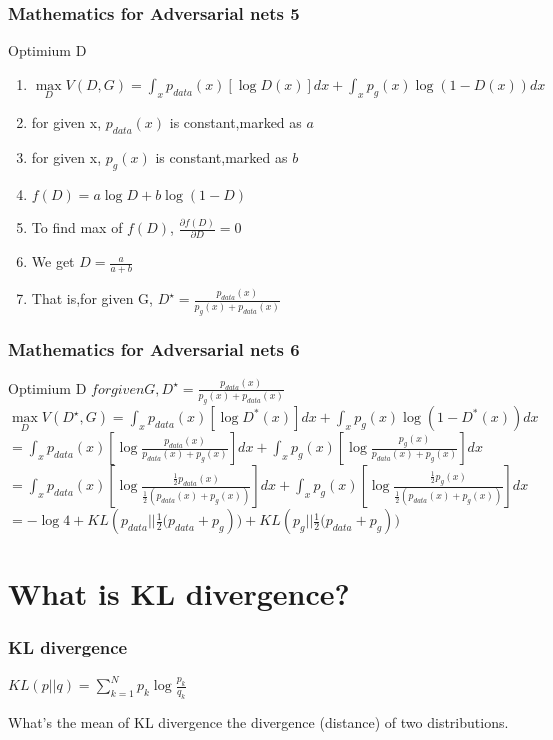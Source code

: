 \documentclass{beamer}[10]
\begin{document}
\begin{frame}
  \frametitle{Mathematics for Adversarial nets 5}
  \begin{block}{Optimium D }
    \begin{enumerate}
      \item $\max \limits_{D} V(D,G) = \int_{x} p_{data}(x)[\log D(x)] dx + \int_{x} p_g(x) \log (1 - D(x)) dx $
      \item for given x,  $p_{data}(x)$ is constant,marked as $a$   
      \item for given x, $p_g(x)$ is constant,marked as  $b$  
      \item $f(D) = a \log D + b \log(1-D)$
      \item To find max of $f(D)$, $ \frac{\partial f(D)}{\partial D} = 0 $
      \item We get $D = \frac{a}{a+b} $
      \item That is,for given G, $D^\star = \frac{p_{data}(x)}{p_g(x) + p_{data}(x)}$
    \end{enumerate}
  \end{block}
\end{frame}

\begin{frame}
  \frametitle{Mathematics for Adversarial nets 6}
  \begin{block}{Optimium D }
      $ for given G, D^\star = \frac{p_{data}(x)}{p_g(x) + p_{data}(x)} $
      $ \max \limits_{D} V(D^\star,G) = \int_{x} p_{data}(x) [\log D^*(x)] dx + \int_{x} p_g(x) \log (1 - D^*(x)) dx $ \\
      $ = \int_{x} p_{data}(x) [\log \frac{p_{data}(x)}{p_{data}(x) + p_g(x)}] dx + \int_{x} p_g(x) [\log \frac{p_g(x)}{p_{data}(x) + p_g(x)}] dx $ \\
      $ = \int_{x} p_{data}(x) [\log \frac{\frac{1}{2}p_{data}(x)}{\frac{1}{2}(p_{data}(x) + p_g(x))}] dx + \int_{x} p_g(x) [\log \frac{\frac{1}{2}p_g(x)}{\frac{1}{2}(p_{data}(x) + p_g(x))}] dx $
      $ = -\log 4 + KL(p_{data} || {\frac{1}{2}(p_{data} + p_g} )) + KL(p_{g} || {\frac{1}{2}(p_{data} + p_g})) $ 
  \end{block}
\end{frame}

\section{What is KL divergence?}
\begin{frame}
  \frametitle{KL divergence}
  \begin{definition}
   $KL(p||q) = \sum_{k=1}^{N} p_k \log \frac{p_k}{q_k} $
  \end{definition}

  \begin{block}{What's the mean of KL divergence}
     the divergence (distance) of two distributions. 
  \end{block}
\end{frame}
\end{document}
